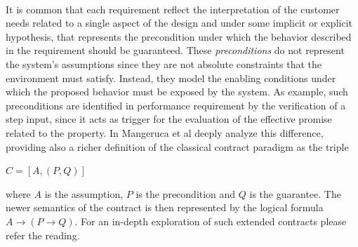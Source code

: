 \paragraph{} It is common that each requirement reflect the interpretation of the customer needs related to a single aspect of the design and under some implicit or explicit hypothesis, that represents the precondition under which the behavior described in the requirement should be guaranteed. These \textit{preconditions} do not represent the system’s assumptions since they are not absolute constraints that the environment must satisfy. Instead, they model the enabling conditions under which the proposed behavior must be exposed by the system. As example, such preconditions are identified in performance requirement by the verification of a step input, since it acts as trigger for the evaluation of the effective promise related to the property. In \citep{mangeruca2013formalization} Mangeruca et al deeply analyze this difference, providing also a richer definition of the classical contract paradigm as the triple
\begin{center}
$C = [A, (P, Q)]$
\end{center}
where $A$ is the assumption, $P$ is the precondition and $Q$ is the guarantee. The newer semantics of the contract is then represented by the logical formula $A \rightarrow (P \rightarrow Q)$. For an in-depth exploration of such extended contracts please refer the reading.